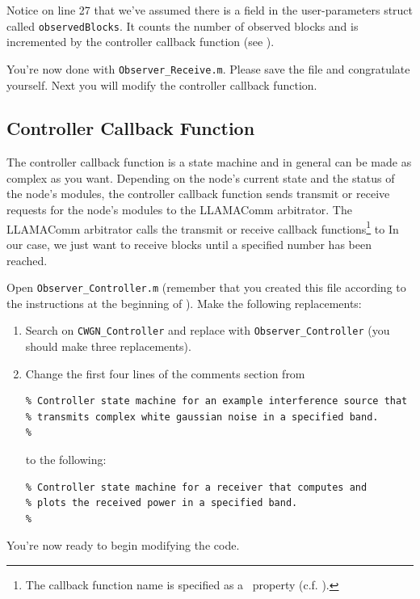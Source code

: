Notice on line 27 that we've assumed there is a field in the user-parameters struct called \verb+observedBlocks+.  It counts the number of observed blocks and is incremented by the controller callback function (see ).

You're now done with \verb+Observer_Receive.m+.  Please save the file and congratulate yourself.  Next you will modify the controller callback function.


\subsection{Controller Callback Function}
\label{sec:observer_controller}

The controller callback function is a state machine and in general can be made as complex as you want.  Depending on the node's current state and the status of the node's modules, the controller callback function sends transmit or receive requests for the node's modules to the LLAMAComm arbitrator. The LLAMAComm arbitrator calls the transmit or receive callback functions\footnote{The callback function name is specified as a \module\ property (c.f. ).} to In our case, we just want to receive blocks until a specified number has been reached.

Open \verb+Observer_Controller.m+ (remember that you created this file according to the instructions at the beginning of ).  Make the following replacements:
\begin{enumerate}
\item Search on \verb+CWGN_Controller+ and replace with \verb+Observer_Controller+ (you should make three replacements).

\item Change the first four lines of the comments section from
%
\begin{lstlisting}[numbers=none]
% Function user_code/Observer_Controller.m:
% Controller state machine for an example interference source that
% transmits complex white gaussian noise in a specified band.
%
\end{lstlisting}
%
to the following:
%
\begin{lstlisting}[numbers=none]
% Function user_code/Observer_Controller.m:
% Controller state machine for a receiver that computes and
% plots the received power in a specified band.
%
\end{lstlisting}
%
\end{enumerate}
You're now ready to begin modifying the code.

